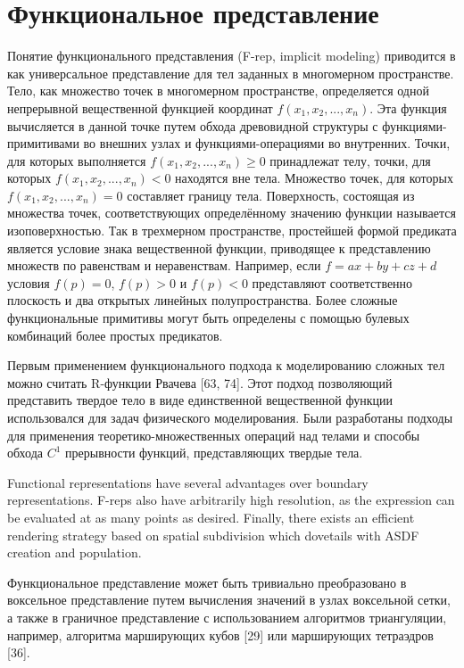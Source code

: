 {{{{{{\section{Функциональное представление} \label{sect_implicit}

Понятие функционального представления (F-rep, implicit modeling) приводится в  как универсальное представление для тел заданных в многомерном пространстве. Тело, как множество точек в многомерном пространстве, определяется одной непрерывной вещественной функцией координат $f(x_{1},x_{2},...,x_{n})$. Эта функция вычисляется в данной точке путем обхода древовидной структуры с функциями-примитивами во внешних узлах и функциями-операциями во внутренних. Точки, для которых выполняется $f(x_{1},x_{2},...,x_{n})\geq 0$ принадлежат телу, точки, для которых $ f(x_{1},x_{2},...,x_{n})<0$ находятся вне тела. Множество точек, для которых $f(x_{1},x_{2},...,x_{n})=0$ составляет границу тела. Поверхность, состоящая из множества точек, соответствующих определённому значению функции называется изоповерхностью. Так в трехмерном пространстве, простейшей формой предиката является условие знака вещественной функции, приводящее к представлению множеств по равенствам и неравенствам. Например, если $ f = ax + by + cz + d$  условия $f (p) = 0$, $f (p)> 0$ и $f (p) <0$ представляют соответственно плоскость и два открытых линейных полупространства. Более сложные функциональные примитивы могут быть определены с помощью булевых комбинаций более простых предикатов.

Первым применением функционального подхода к моделированию сложных тел можно считать R-функции Рвачева [63, 74]. Этот подход позволяющий представить твердое тело в виде единственной вещественной функции использовался для задач физического моделирования. Были разработаны подходы для применения теоретико-множественных операций над телами и способы обхода $C^1$ прерывности функций, представляющих твердые тела.

Functional representations have several advantages over boundary representations.
F-reps also have arbitrarily high resolution, as the expression can be evaluated at as many
points as desired. Finally, there exists an efficient rendering strategy based on spatial
subdivision which dovetails with ASDF creation and population.

Функциональное представление может быть тривиально преобразовано в воксельное представление путем вычисления значений в узлах воксельной сетки, а также в граничное представление с использованием алгоритмов триангуляции, например, алгоритма марширующих кубов [29] или марширующих тетраэдров [36].

}}}}}}

